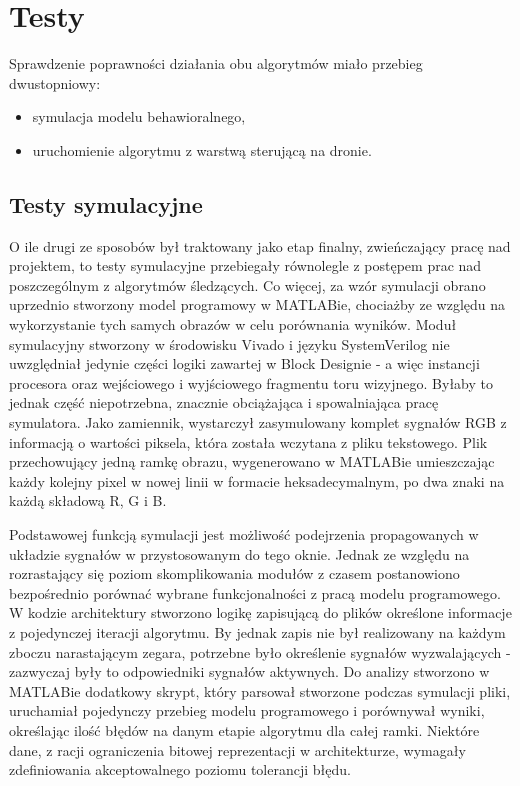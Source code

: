 \chapter{Testy}

Sprawdzenie poprawności działania obu algorytmów miało przebieg dwustopniowy:
\begin{itemize}
	\item symulacja modelu behawioralnego,
	\item uruchomienie algorytmu z warstwą sterującą na dronie.
\end{itemize}

\section{Testy symulacyjne}
O ile drugi ze sposobów był traktowany jako etap finalny, zwieńczający pracę nad projektem, to testy symulacyjne przebiegały równolegle z postępem prac nad poszczególnym z algorytmów śledzących. Co więcej, za wzór symulacji obrano uprzednio stworzony model programowy w MATLABie, chociażby ze względu na wykorzystanie tych samych obrazów w celu porównania wyników.
Moduł symulacyjny stworzony w środowisku Vivado i języku SystemVerilog nie uwzględniał jedynie części logiki zawartej w Block Designie - a więc instancji procesora oraz wejściowego i wyjściowego fragmentu toru wizyjnego. Byłaby to jednak część niepotrzebna, znacznie obciążająca i spowalniająca pracę symulatora. Jako zamiennik, wystarczył zasymulowany komplet sygnałów RGB z informacją o wartości piksela, która została wczytana z pliku tekstowego. Plik przechowujący jedną ramkę obrazu, wygenerowano w MATLABie umieszczając każdy kolejny pixel w nowej linii w formacie heksadecymalnym, po dwa znaki na każdą składową R, G i B.

Podstawowej funkcją symulacji jest możliwość podejrzenia propagowanych w układzie sygnałów w przystosowanym do tego oknie. Jednak ze względu na rozrastający się poziom skomplikowania modułów z czasem postanowiono bezpośrednio porównać wybrane funkcjonalności z pracą modelu programowego. W kodzie architektury stworzono logikę zapisującą do plików określone informacje z pojedynczej iteracji algorytmu. By jednak zapis nie był realizowany na każdym zboczu narastającym zegara, potrzebne było określenie sygnałów wyzwalających - zazwyczaj były to odpowiedniki sygnałów aktywnych. Do analizy stworzono w MATLABie dodatkowy skrypt, który parsował stworzone podczas symulacji pliki, uruchamiał pojedynczy przebieg modelu programowego i porównywał wyniki, określając ilość błędów na danym etapie algorytmu dla całej ramki. Niektóre dane, z racji ograniczenia bitowej reprezentacji w architekturze, wymagały zdefiniowania akceptowalnego poziomu tolerancji błędu.


